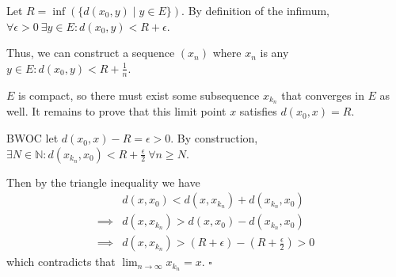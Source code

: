 \documentclass[12pt]{article}
\newcommand{\N}{\mathbb{N}}
\begin{document}
Let $R = \inf(\{d(x_0, y) \mid y \in E\})$.
By definition of the infimum, $\forall \epsilon > 0\ \exists y \in E: d(x_0, y) < R + \epsilon$.

Thus, we can construct a sequence $(x_n)$ where $x_n$ is any $y \in E: d(x_0, y) < R + \frac{1}{n}$.

$E$ is compact, so there must exist some subsequence $x_{k_n}$ that converges in $E$ as well.
It remains to prove that this limit point $x$ satisfies $d(x_0, x) = R$.

BWOC let $d(x_0, x) - R = \epsilon > 0$.
By construction, $\exists N \in \N: d(x_{k_n}, x_0) < R+\frac{\epsilon}{2}\ \forall n \ge N$.

Then by the triangle inequality we have
\begin{align*}
  & d(x, x_0) < d(x, x_{k_n}) + d(x_{k_n}, x_0) \\
  \implies{} & d(x, x_{k_n}) > d(x, x_0) - d(x_{k_n}, x_0) \\
  \implies{} & d(x, x_{k_n}) > (R + \epsilon) - \left(R + \frac{\epsilon}{2}\right) > 0
\end{align*}
which contradicts that $\lim_{n \to \infty} x_{k_n} = x$. $\square$
\end{document}
